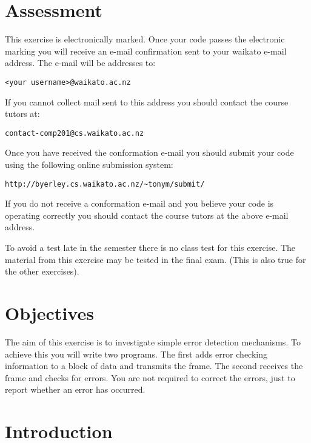 \documentclass[a4paper,10pt]{article}
\begin{document}


\section{Assessment}

This exercise is electronically marked. Once your code passes the
electronic marking you will receive an e-mail confirmation sent to your
waikato e-mail address. The e-mail will be addresses to:

\begin{center}
\texttt{<your username>@waikato.ac.nz}
\end{center}

If you cannot collect mail sent to this address you should contact the
course tutors at:

\begin{center}
\texttt{contact-comp201@cs.waikato.ac.nz}
\end{center}

Once you have received the conformation e-mail you should submit your code
using the following online submission system:

\begin{center}
\verb+http://byerley.cs.waikato.ac.nz/~tonym/submit/+\\
\end{center}

If you do not receive a conformation e-mail and you believe your code is
operating correctly you should contact the course tutors at the above
e-mail address.

To avoid a test late in the semester there is no class test for this
exercise.  The material from this exercise may be tested in the final
exam. (This is also true for the other exercises).

\section{Objectives}

The aim of this exercise is to investigate simple error detection
mechanisms. To achieve this you will write two programs.  The first adds
error checking information to a block of data and transmits the frame.  The
second receives the frame and checks for errors.  You are not required to
correct the errors, just to report whether an error has occurred.

\section{Introduction} 
\end{document}
